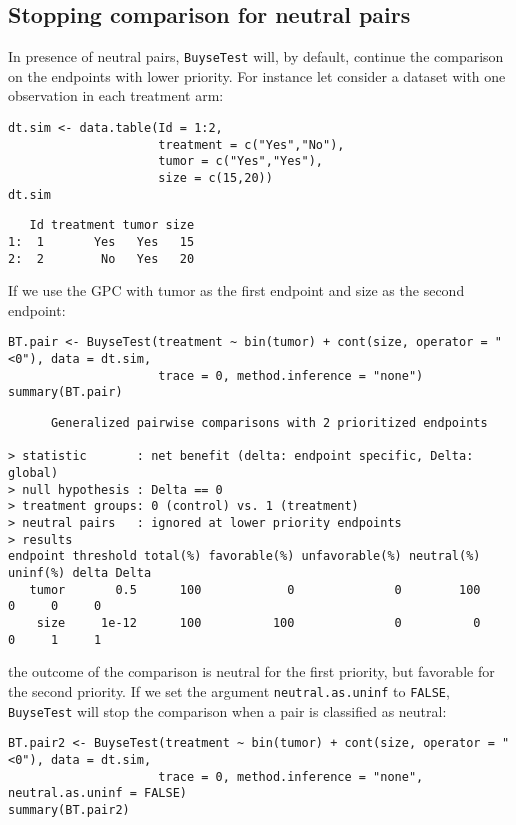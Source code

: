 \documentclass[12pt]{article}
\begin{document}
\subsection{Stopping comparison for neutral pairs}
\label{sec:org7a4167a}
In presence of neutral pairs, \texttt{BuyseTest} will, by default, continue
the comparison on the endpoints with lower priority. For instance let
consider a dataset with one observation in each treatment arm:
\lstset{language=r,label= ,caption= ,captionpos=b,numbers=none}
\begin{lstlisting}
dt.sim <- data.table(Id = 1:2,
					 treatment = c("Yes","No"),
					 tumor = c("Yes","Yes"),
					 size = c(15,20))
dt.sim
\end{lstlisting}

\begin{verbatim}
   Id treatment tumor size
1:  1       Yes   Yes   15
2:  2        No   Yes   20
\end{verbatim}

\clearpage

If we use the GPC with tumor as the first endpoint and size as the
second endpoint:
\lstset{language=r,label= ,caption= ,captionpos=b,numbers=none}
\begin{lstlisting}
BT.pair <- BuyseTest(treatment ~ bin(tumor) + cont(size, operator = "<0"), data = dt.sim,
					 trace = 0, method.inference = "none")
summary(BT.pair)
\end{lstlisting}

\begin{verbatim}
      Generalized pairwise comparisons with 2 prioritized endpoints

> statistic       : net benefit (delta: endpoint specific, Delta: global) 
> null hypothesis : Delta == 0 
> treatment groups: 0 (control) vs. 1 (treatment) 
> neutral pairs   : ignored at lower priority endpoints
> results
endpoint threshold total(%) favorable(%) unfavorable(%) neutral(%) uninf(%) delta Delta
   tumor       0.5      100            0              0        100        0     0     0
    size     1e-12      100          100              0          0        0     1     1
\end{verbatim}

the outcome of the comparison is neutral for the first priority, but
favorable for the second priority. If we set the argument
\texttt{neutral.as.uninf} to \texttt{FALSE}, \texttt{BuyseTest} will stop the comparison
when a pair is classified as neutral:
\lstset{language=r,label= ,caption= ,captionpos=b,numbers=none}
\begin{lstlisting}
BT.pair2 <- BuyseTest(treatment ~ bin(tumor) + cont(size, operator = "<0"), data = dt.sim,
					 trace = 0, method.inference = "none", neutral.as.uninf = FALSE)
summary(BT.pair2)
\end{lstlisting}
\end{document}
